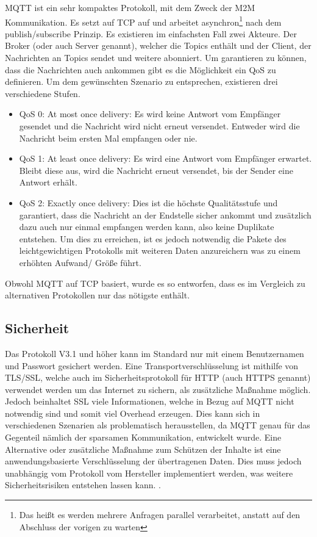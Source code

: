         \ac{MQTT} ist ein sehr kompaktes Protokoll, mit dem Zweck der \ac{M2M} Kommunikation.
        Es setzt auf TCP auf und arbeitet asynchron\footnote{Das heißt es werden mehrere Anfragen parallel verarbeitet, anstatt auf den Abschluss der vorigen zu warten} nach dem publish/subscribe Prinzip. Es existieren im einfachsten Fall zwei Akteure. Der Broker (oder auch Server genannt), welcher die Topics enthält und der Client, der Nachrichten an Topics sendet und weitere abonniert.
        Um garantieren zu können, dass die Nachrichten auch ankommen gibt es die Möglichkeit ein \ac{QoS} zu definieren. Um dem gewünschten Szenario zu entsprechen, existieren drei verschiedene Stufen. 
        \cite{soni2017survey}
        \begin{itemize}
            \item \glqq QoS 0: At most once delivery\grqq{}: Es wird keine Antwort vom Empfänger gesendet und die Nachricht wird nicht erneut versendet. Entweder wird die Nachricht beim ersten Mal empfangen oder nie.
            \item \glqq QoS 1: At least once delivery\grqq{}: Es wird eine Antwort vom Empfänger erwartet. Bleibt diese aus, wird die Nachricht erneut versendet, bis der Sender eine Antwort erhält.
            \item \glqq QoS 2: Exactly once delivery\grqq{}: Dies ist die höchste Qualitätsstufe und garantiert, dass die Nachricht an der Endstelle sicher ankommt und zusätzlich dazu auch nur einmal empfangen werden kann, also keine Duplikate entstehen. Um dies zu erreichen, ist es jedoch notwendig die Pakete des leichtgewichtigen Protokolls mit weiteren Daten anzureichern was zu einem erhöhten Aufwand/ Größe führt.
        \end{itemize} \cite{gupta_banks_2015}
        Obwohl \ac{MQTT} auf \ac{TCP} basiert, wurde es so entworfen, dass es im Vergleich zu alternativen Protokollen nur das nötigste enthält. \cite{soni2017survey}

    \subsection{Sicherheit}
        Das Protokoll V3.1 und höher kann im Standard nur mit einem Benutzernamen und Passwort gesichert werden. Eine Transportverschlüsselung ist mithilfe von \ac{TLS}/\ac{SSL}, welche auch im Sicherheitsprotokoll für \ac{HTTP} (auch \ac{HTTPS} genannt) verwendet werden um das Internet zu sichern, als zusätzliche Maßnahme möglich. Jedoch beinhaltet SSL viele Informationen, welche in Bezug auf \ac{MQTT} nicht notwendig sind und somit viel Overhead erzeugen.
        Dies kann sich in verschiedenen Szenarien als problematisch herausstellen, da \ac{MQTT} genau für das Gegenteil nämlich der sparsamen Kommunikation, entwickelt wurde.
        Eine Alternative oder zusätzliche Maßnahme zum Schützen der Inhalte ist eine anwendungsbasierte Verschlüsselung der übertragenen Daten. Dies muss jedoch unabhängig vom Protokoll vom Hersteller implementiert werden, was weitere Sicherheitsrisiken entstehen lassen kann. \cite{mqtt_org_2019}.

